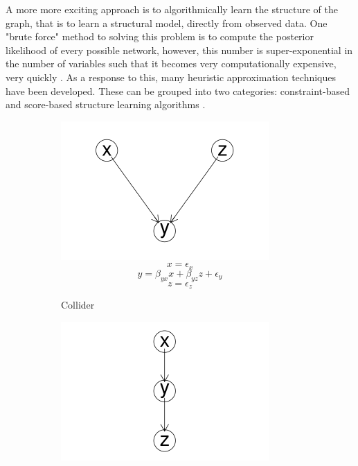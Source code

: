 \documentclass{article}
\begin{document}
A more more exciting approach is to algorithmically learn the structure of the graph, that is to learn a structural model, directly from observed data. One "brute force" method to solving this problem is to compute the posterior likelihood of every possible network, however, this number is super-exponential in the number of variables such that it becomes very computationally expensive, very quickly \parencite{chickering1996learning}. As a response to this, many heuristic approximation techniques have been developed. These can be grouped into two categories: constraint-based and score-based structure learning algorithms \parencite{spirtes1991algorithm} \parencite{verma1991equivalence}. 

\begin{figure}
  \centering
  \begin{subfigure}{0.3\textwidth}
    \centering
    \includegraphics[width=\linewidth]{images/collider.png} 
    \small
    \begin{equation*}
      x = \epsilon_{x}
    \end{equation*}
    \begin{equation*}
      y = \beta_{yx} x + \beta_{yz} z + \epsilon_{y}
    \end{equation*}
    \begin{equation*}
      z = \epsilon_{z}
    \end{equation*}
    \caption{Collider}
    \label{collider}
  \end{subfigure}
  \begin{subfigure}{0.3\textwidth}
    \includegraphics[width=\linewidth]{images/chain.png}

\end{subfigure}
\end{figure}
\end{document}
